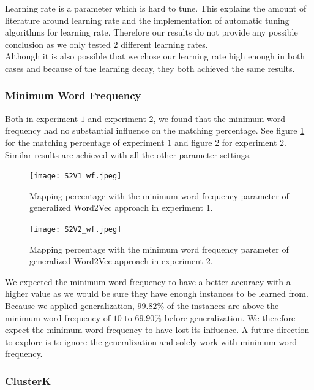 Learning rate is a parameter which is hard to tune. This explains the amount of literature around learning rate and the implementation of automatic tuning algorithms for learning rate. Therefore our results do not provide any possible conclusion as we only tested $2$ different learning rates. \\
Although it is also possible that we chose our learning rate high enough in both cases and because of the learning decay, they both achieved the same results.

\subsubsection*{Minimum Word Frequency}

Both in experiment $1$ and experiment $2$, we found that the minimum word frequency had no substantial influence on the matching percentage. See figure \ref{fig:s2v_vl_1} for the matching percentage of experiment $1$ and figure \ref{fig:s2v_vl_2} for experiment $2$. Similar results are achieved with all the other parameter settings. \\

\begin{figure}[!htb]
	\centering
	\texttt{[image: S2V1\_wf.jpeg]}
	\caption{Mapping percentage with the minimum word frequency parameter of generalized Word2Vec approach in experiment 1.}
	\label{fig:s2v_vl_1}
\end{figure}

\begin{figure}[!htb]
	\centering
	\texttt{[image: S2V2\_wf.jpeg]}
	\caption{Mapping percentage with the minimum word frequency parameter of generalized Word2Vec approach in experiment 2.}
	\label{fig:s2v_vl_2}
\end{figure}

We expected the minimum word frequency to have a better accuracy with a higher value as we would be sure they have enough instances to be learned from. Because we applied generalization, $99.82$\% of the instances are above the minimum word frequency of $10$ to $69.90$\% before generalization. We therefore expect the minimum word frequency to have lost its influence. A future direction to explore is to ignore the generalization and solely work with minimum word frequency.

\subsubsection*{ClusterK}

